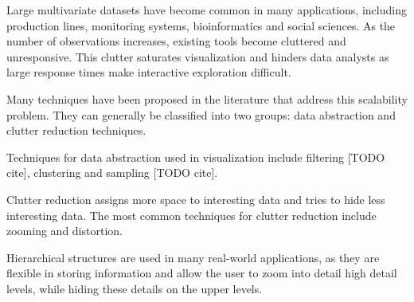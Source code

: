 Large multivariate datasets have become common in many applications, including production lines,
monitoring systems, bioinformatics and social sciences. As the number of observations increases,
existing tools become cluttered and unresponsive. This clutter saturates visualization and hinders
data analysts as large response times make interactive exploration difficult.

Many techniques have been proposed in the literature that address this scalability problem.
They can generally be classified into two groups: data abstraction and clutter reduction 
techniques.

Techniques for data abstraction used in visualization include filtering [TODO cite], clustering
and sampling [TODO cite].

Clutter reduction assigns more space to interesting data and tries to hide less interesting data.
The most common techniques for clutter reduction include zooming and distortion.

Hierarchical structures are used in many real-world applications, as they are flexible in storing information
and allow the user to zoom into detail high detail levels, while hiding these details on the upper levels.

